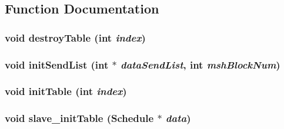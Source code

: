 \subsection{Function Documentation}
\hypertarget{register_8C_a099f07ebad307cc1509766f32cfcba5f}{
\subsubsection[{destroyTable}]{\setlength{\rightskip}{0pt plus 5cm}void destroyTable (int {\em index})}}
\label{register_8C_a099f07ebad307cc1509766f32cfcba5f}
\hypertarget{register_8C_a4e113cf30f6198d50fb212074effcc61}{
\subsubsection[{initSendList}]{\setlength{\rightskip}{0pt plus 5cm}void initSendList (int $\ast$ {\em dataSendList}, \/  int {\em mshBlockNum})}}
\label{register_8C_a4e113cf30f6198d50fb212074effcc61}
\hypertarget{register_8C_a14fad51cfceca5a582218c98bdb3d769}{
\subsubsection[{initTable}]{\setlength{\rightskip}{0pt plus 5cm}void initTable (int {\em index})}}
\label{register_8C_a14fad51cfceca5a582218c98bdb3d769}
\hypertarget{register_8C_af2778897e39d6df9bd4aa5d53c3cda1c}{
\subsubsection[{slave\_\-initTable}]{\setlength{\rightskip}{0pt plus 5cm}void slave\_\-initTable ({\bf Schedule} $\ast$ {\em data})}}
\label{register_8C_af2778897e39d6df9bd4aa5d53c3cda1c}
